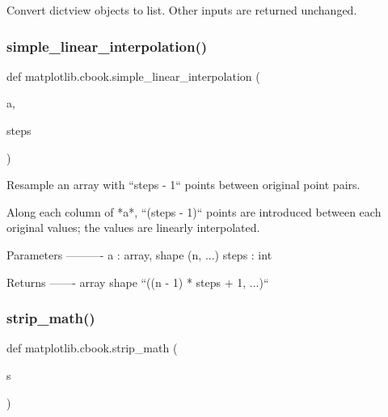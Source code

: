 \begin{DoxyVerb}Convert dictview objects to list. Other inputs are returned unchanged.
\end{DoxyVerb}
 \mbox{\label{namespacematplotlib_1_1cbook_a10de3acab7db43705a4a1a2ce7b12098}} 
\subsubsection{\texorpdfstring{simple\+\_\+linear\+\_\+interpolation()}{simple\_linear\_interpolation()}}
{\footnotesize\ttfamily def matplotlib.\+cbook.\+simple\+\_\+linear\+\_\+interpolation (\begin{DoxyParamCaption}\item[{}]{a,  }\item[{}]{steps }\end{DoxyParamCaption})}

\begin{DoxyVerb}Resample an array with ``steps - 1`` points between original point pairs.

Along each column of *a*, ``(steps - 1)`` points are introduced between
each original values; the values are linearly interpolated.

Parameters
----------
a : array, shape (n, ...)
steps : int

Returns
-------
array
    shape ``((n - 1) * steps + 1, ...)``
\end{DoxyVerb}
 \mbox{\label{namespacematplotlib_1_1cbook_aabc39eda5a8d0e60cdccc70fcf31011f}} 
\subsubsection{\texorpdfstring{strip\+\_\+math()}{strip\_math()}}
{\footnotesize\ttfamily def matplotlib.\+cbook.\+strip\+\_\+math (\begin{DoxyParamCaption}\item[{}]{s }\end{DoxyParamCaption})}

